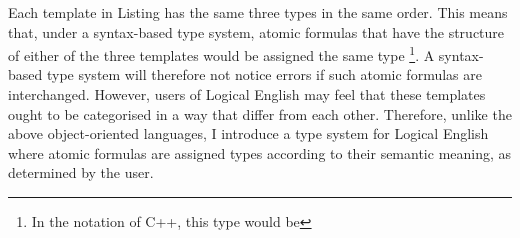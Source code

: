 \documentclass[../main.tex]{subfiles}
\begin{document}
Each template in Listing \cite{le:same-product-type} has the same three types in the same order. This means that, under a syntax-based type system, atomic formulas that have the structure of either of the three templates would be assigned the same type 
\footnote{In the notation of C++, this type would be }.
A syntax-based type system will therefore not notice errors if such atomic formulas are interchanged. However, users of Logical English may feel that these templates ought to be categorised in a way that differ from each other. Therefore, unlike the above object-oriented languages, I introduce a type system for Logical English where atomic formulas are assigned types according to their semantic meaning, as determined by the user.
\end{document}
